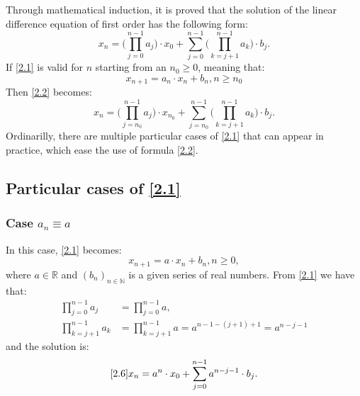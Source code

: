 \documentclass[a4paper,11pt]{report}
\newcommand{\R}{\mathbb{R}}
\begin{document}
Through mathematical induction, it is proved that the solution of the linear difference equation of first order has the following form:
\begin{equation}\label{2.2}
 x_{n}=\bigg( \prod_{j=0}^{n-1} a_{j} \bigg) \cdot x_{0} + \sum_{j=0}^{n-1} \bigg( \prod_{k=j+1}^{n-1} a_{k} \bigg)\cdot b_{j}.
\end{equation}
If \eqref{2.1} is valid for $n$ starting from an $n_{0} \geq 0$, meaning that:
\begin{equation}\label{2.3}
 x_{n+1}=a_{n}\cdot x_{n}+b_{n}, n\geq n_{0}
\end{equation}
Then \eqref{2.2} becomes:
\begin{equation}
 x_{n}=\bigg( \prod_{j=n_{0}}^{n-1} a_{j} \bigg) \cdot x_{n_{0}} + \sum_{j=n_{0}}^{n-1} \bigg( \prod_{k=j+1}^{n-1} a_{k} \bigg)\cdot b_{j}.
\end{equation}
Ordinarilly, there are multiple particular cases of \eqref{2.1} that can appear in practice, which ease the use of formula \eqref{2.2}.
\subsection{Particular cases of \eqref{2.1}}
\subsubsection{Case $a_{n}\equiv a$} \label{i}
In this case, \eqref{2.1} becomes:
\begin{equation}
\label{2.6}
 x_{n+1}=a\cdot x_{n}+b_{n}, n\geq 0,
\end{equation}
where $a\in \R$ and $(b_{n})_{n\in\mathbb{N}}$ is a given series of real numbers.
From \eqref{2.1} we have that:
\begin{align*}
 \prod_{j=0}^{n-1} a_{j} &=\prod_{j=0}^{n-1} a,\\
 \prod_{k=j+1}^{n-1} a_{k}&=\prod_{k=j+1}^{n-1} a=a^{n-1-(j+1)+1}=a^{n-j-1}
\end{align*}
and the solution is:
\begin{equation}\eqref{2.6}
 x_{n}=a^{n}\cdot x_{0}+\sum_{j=0}^{n-1} a^{n-j-1}\cdot b_{j}.
\end{equation}
\end{document}
